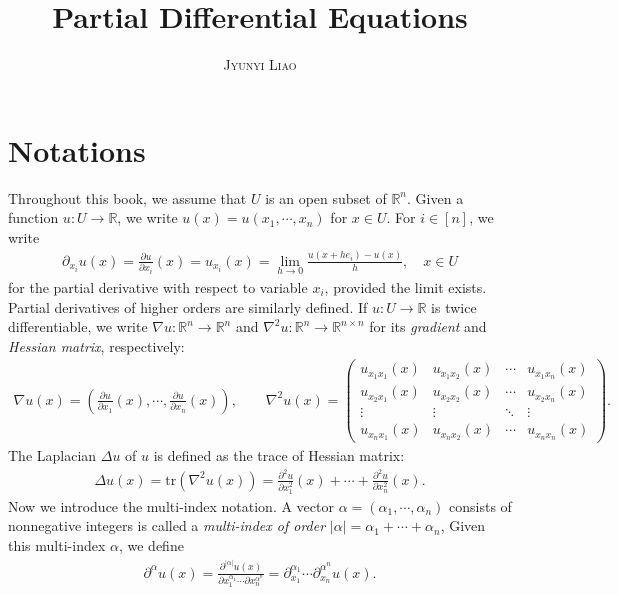 \documentclass{article}
\title{\bf Partial Differential Equations}
\author{\textsc{Jyunyi Liao}}
\date{}
\numberwithin{equation}{section}
\theoremstyle{plain}
\theoremstyle{definition}
\begin{document}
\maketitle
\tableofcontents
\newpage
\setcounter{section}{-1}
\section{Notations}
Throughout this book, we assume that $U$ is an open subset of $\mathbb{R}^n$. Given a function $u:U\to\mathbb{R}$, we write $u(x)=u(x_1,\cdots,x_n)$ for $x\in U$. For $i\in[n]$, we write
\begin{align*}
	\partial_{x_i}u(x)=\frac{\partial u}{\partial x_i}(x)=u_{x_i}(x)=\lim_{h\to 0}\frac{u(x+he_i)-u(x)}{h},\quad x\in U
\end{align*}
for the partial derivative with respect to variable $x_i$, provided the limit exists. Partial derivatives of higher orders are similarly defined. If $u:U\to\mathbb{R}$ is twice differentiable, we write $\nabla u:\mathbb{R}^n\to\mathbb{R}^n$ and $\nabla^2 u:\mathbb{R}^n\to\mathbb{R}^{n\times n}$ for its \textit{gradient} and \textit{Hessian matrix}, respectively:
\begin{align*}
	\nabla u(x)=\left(\frac{\partial u}{\partial x_1}(x),\cdots,\frac{\partial u}{\partial x_n}(x)\right),\qquad \nabla^2 u(x)=\begin{pmatrix}
		u_{x_1x_1}(x) & u_{x_1x_2}(x) & \cdots & u_{x_1x_n}(x)\\
		u_{x_2x_1}(x) & u_{x_2x_2}(x) & \cdots & u_{x_2x_n}(x)\\
		\vdots & \vdots & \ddots & \vdots \\
		u_{x_nx_1}(x) & u_{x_nx_2}(x) & \cdots & u_{x_nx_n}(x)
	\end{pmatrix}.
\end{align*}
The Laplacian $\Delta u$ of $u$ is defined as the trace of Hessian matrix:
\begin{align*}
	\Delta u(x) = \mathrm{tr}(\nabla^2 u(x))=\frac{\partial^2 u}{\partial x_1^2}(x)+\cdots + \frac{\partial^2 u}{\partial x_n^2}(x).
\end{align*}
Now we introduce the multi-index notation. A vector $\alpha=(\alpha_1,\cdots,\alpha_n)$ consists of nonnegative integers is called a \textit{multi-index of order} $\vert\alpha\vert=\alpha_1+\cdots+\alpha_n$, Given this multi-index $\alpha$, we define
\begin{align*}
	\partial^\alpha u(x) = \frac{\partial^{\vert\alpha\vert}u(x)}{\partial x_1^{\alpha_1}\cdots\partial x_n^{\alpha^n}}=\partial_{x_1}^{\alpha_1}\cdots\partial_{x_n}^{\alpha^n} u(x).
\end{align*}
\end{document}
